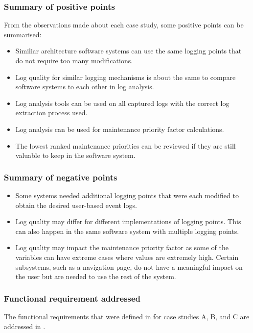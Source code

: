 \subsubsection{Summary of positive points}
From the observations made about each case study, some positive points can be summarised:

\begin{itemize}
	\item Similiar architecture software systems can use the same logging points that do not require too many modifications.
	\item Log quality for similar logging mechanisms is about the same to compare software systems to each other in log analysis.
	\item Log analysis tools can be used on all captured logs with the correct log extraction process used.
	\item Log analysis can be used for maintenance priority factor calculations.
	\item The lowest ranked maintenance priorities can be reviewed if they are still valuable to keep in the software system.
\end{itemize}

\subsubsection{Summary of negative points}

\begin{itemize}
	\item Some systems needed additional logging points that were each modified to obtain the desired user-based event logs.
	\item Log quality may differ for different implementations of logging points. This can also happen in the same software system with multiple logging points.
	\item Log quality may impact the maintenance priority factor as some of the variables can have extreme cases where values are extremely high. Certain subsystems, such as a navigation page, do not have a meaningful impact on the user but are needed to use the rest of the system.
\end{itemize}

\clearpage

\subsubsection{Functional requirement addressed}
The functional requirements that were defined in  for case studies A, B, and C are addressed in .

